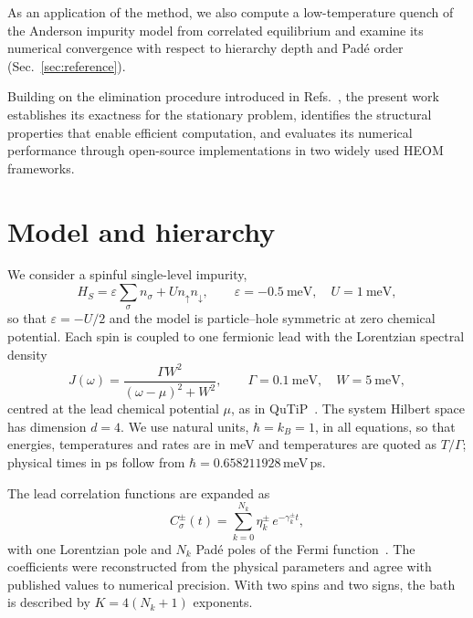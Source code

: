 \documentclass[11pt,a4paper]{article}
\begin{document}
As an application of the method, we also compute a low-temperature quench of
the Anderson impurity model from correlated equilibrium and examine its
numerical convergence with respect to hierarchy depth and Padé order
(Sec.~\ref{sec:reference}).

Building on the elimination procedure introduced in
Refs.~\cite{Hou2015,KasparThoss2021}, the present work establishes its exactness
for the stationary problem, identifies the structural properties that enable
efficient computation, and evaluates its numerical performance through
open-source implementations in two widely used HEOM frameworks.

\section{Model and hierarchy}\label{sec:model}

We consider a spinful single-level impurity,
\begin{equation}
H_S = \varepsilon \sum_{\sigma} n_\sigma + U n_\uparrow n_\downarrow ,
\qquad \varepsilon = -0.5~\mathrm{meV},\quad U = 1~\mathrm{meV},
\end{equation}
so that $\varepsilon = -U/2$ and the model is particle--hole symmetric at zero
chemical potential. Each spin is coupled to one fermionic lead with the Lorentzian
spectral density
\begin{equation}
J(\omega) = \frac{\Gamma W^2}{(\omega - \mu)^2 + W^2},
\qquad \Gamma = 0.1~\mathrm{meV},\quad W = 5~\mathrm{meV},
\end{equation}
centred at the lead chemical potential $\mu$, as in QuTiP~\cite{Lambert2023}. The system
Hilbert space has dimension $d = 4$. We use natural units, $\hbar = k_B = 1$, in all equations, so that energies,
temperatures and rates are in meV and temperatures are quoted as $T/\Gamma$;
physical times in ps follow from $\hbar = 0.658211928$\,meV\,ps.

The lead correlation functions are expanded as
\begin{equation}
C^{\pm}_{\sigma}(t) = \sum_{k=0}^{N_k} \eta^{\pm}_{k}\, e^{-\gamma^{\pm}_{k} t},
\end{equation}
with one Lorentzian pole and $N_k$ Padé poles of the Fermi
function~\cite{HuXuYan2010}. The coefficients were reconstructed from the
physical parameters and agree with published values to numerical precision.
With two spins and two signs, the bath is described by $K = 4(N_k + 1)$
exponents.
\end{document}
